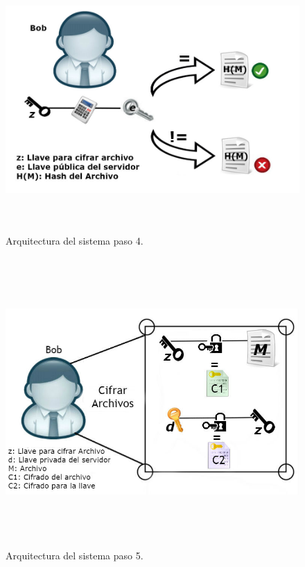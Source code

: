 \begin{figure}[H]
\centering
\includegraphics[width=16cm, height=10cm]{./images/Paso3_5.jpg}
\caption{Arquitectura del sistema paso 4.}

\end{figure}

\begin{figure}[H]
\centering
\includegraphics[width=16cm, height=11cm]{./images/Paso04.jpg}
\caption{Arquitectura del sistema paso 5.}

\end{figure}

